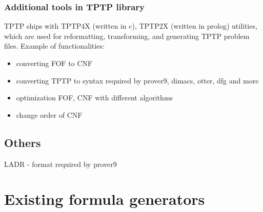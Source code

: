 
\subsubsection{Additional tools in TPTP library}

TPTP ships with TPTP4X (written in c), TPTP2X (written in prolog) utilities, which are used for reformatting, transforming, and generating TPTP problem files. Example of functionalities:

\begin{itemize}
  \item converting \gls{FOF} to \gls{CNF}
  \item converting TPTP to syntax required by prover9, dimacs, otter, dfg and more
  \item optimization \gls{FOF}, \gls{CNF} with different algorithms
  \item change order of \gls{CNF}
\end{itemize}

\subsection{Others}

LADR - format required by prover9

\section{Existing formula generators}
